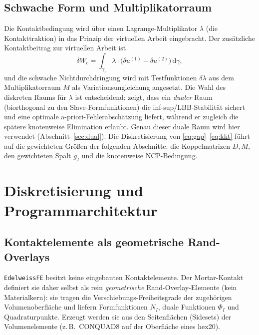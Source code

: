 \documentclass[a4paper,11pt]{article}
\def\bm#1{#1}%
\def\tilde#1{#1}%
\newcommand{\code}[1]{\texttt{\small #1}}
\let\stdsection\section
\renewcommand{\section}{\clearpage\stdsection}
\begin{document}
\subsection{Schwache Form und Multiplikatorraum}
Die Kontaktbedingung wird über einen Lagrange-Multiplikator $\bm\lambda$ (die Kontakttraktion) in
das Prinzip der virtuellen Arbeit eingebracht. Der zusätzliche Kontaktbeitrag zur virtuellen Arbeit
ist
\begin{equation}
\delta W_c = \int_{\gamma_c} \bm\lambda\cdot\big(\delta\bm u^{(1)} - \delta\bm u^{(2)}\big)\,
\mathrm d\gamma,
\end{equation}
und die schwache Nichtdurchdringung wird mit Testfunktionen $\delta\bm\lambda$ aus dem
Multiplikatorraum $M$ als Variationsungleichung angesetzt. Die Wahl des diskreten Raums für
$\bm\lambda$ ist entscheidend: \citet{wohlmuth2000} zeigt, dass ein \emph{dualer} Raum
(biorthogonal zu den Slave-Formfunktionen) die inf-sup/LBB-Stabilität sichert und eine optimale
a-priori-Fehlerabschätzung liefert, während er zugleich die spätere knotenweise Elimination erlaubt.
Genau dieser duale Raum wird hier verwendet (Abschnitt~\ref{sec:dual}). Die Diskretisierung von
\eqref{eq:gap}--\eqref{eq:kkt} führt auf die gewichteten Größen der folgenden Abschnitte: die
Koppelmatrizen $\bm D,\bm M$, den gewichteten Spalt $\tilde g_I$ und die knotenweise
NCP-Bedingung.

\section{Diskretisierung und Programmarchitektur}
\label{sec:architektur}

\subsection{Kontaktelemente als geometrische Rand-Overlays}
\code{EdelweissFE} besitzt keine eingebauten Kontaktelemente. Der Mortar-Kontakt definiert sie daher
selbst als rein \emph{geometrische} Rand-Overlay-Elemente (kein Materialkern): sie tragen die
Verschiebungs-Freiheitsgrade der zugehörigen Volumenoberfläche und liefern Formfunktionen $N_I$,
duale Funktionen $\Phi_I$ und Quadraturpunkte. Erzeugt werden sie aus den Seitenflächen (Sidesets)
der Volumenelemente (z.\,B.\ CONQUAD8 auf der Oberfläche eines hex20).
\end{document}
